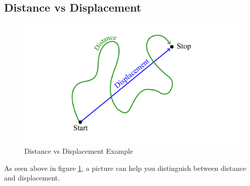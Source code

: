 \subsection{Distance vs Displacement}
\begin{figure}[h]
	\centering
	\includegraphics[scale=0.2]{images/distance-vs-displacementphoto}
	\caption{Distance vs Displacement Example}
	\label{fig:DisplacmentVsDistance}
\end{figure}
As seen above in figure \ref{fig:DisplacmentVsDistance}, a picture can help you distinguish between distance and displacement.